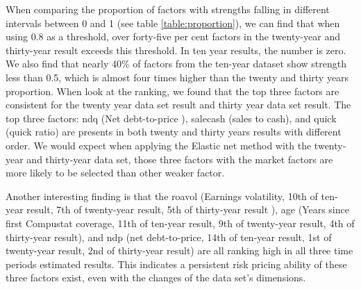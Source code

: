 When comparing the proportion of factors with strengths falling in different intervals between 0 and 1 (see table \ref{table:proportion}), we can find that when using 0.8 as a threshold, over forty-five per cent factors in the twenty-year and thirty-year result exceeds this threshold.
In ten year results, the number is zero.
We also find that nearly 40\% of factors from the ten-year dataset show strength less than 0.5, which is almost four times higher than the twenty and thirty years proportion.
When look at the ranking, we found that the top three factors are consistent for the twenty year data set result and thirty year data set result.
The top three factors: ndq (Net debt-to-price ), salecash (sales to cash), and quick (quick ratio) are presents in both twenty and thirty years results with different order.
We would expect when applying the Elastic net method with the twenty-year and thirty-year data set, those three factors with the market factors are more likely to be selected than other weaker factor.

Another interesting finding is that the roavol (Earnings volatility, 10th of ten-year result, 7th of twenty-year result, 5th of thirty-year result ), age (Years since first Compustat coverage, 11th of ten-year result, 9th of twenty-year result, 4th of thirty-year result), and ndp (net debt-to-price, 14th of ten-year result, 1st of twenty-year result, 2nd of thirty-year result) are all ranking high  in all three time periods estimated results.
This indicates a persistent risk pricing ability of these three factors exist, even with the changes of the data set's dimensions.

